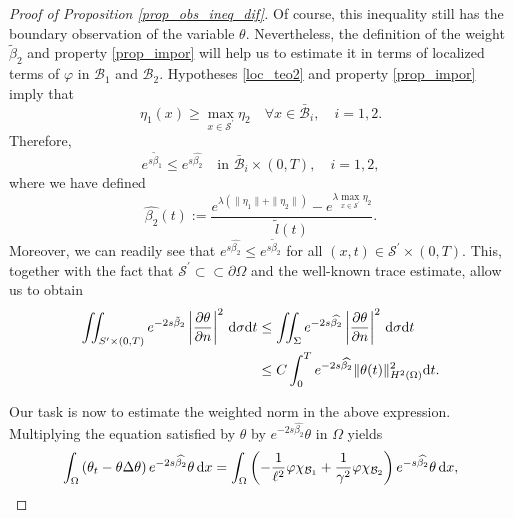 \documentclass[preprint,10pt]{article}
\numberwithin{equation}{section}
\numberwithin{theorem}{section}
\def\dx{\,\textnormal{d}x}
\def\dt{\textnormal{d}t}
\def\d{\,\textnormal{d}}
\newcommand\csin[1]{\chi_{#1}}
\def\dx{\,\textnormal{d}x}
\def\dt{\textnormal{d}t}
\def\d{\,\textnormal{d}}
\begin{document}
{\begin{proof}[Proof of Proposition \ref{prop_obs_ineq_dif}]
 Of course, this inequality still has the boundary observation of the variable $\theta$. Nevertheless, the definition of the weight $\tilde\beta_2$ and property \eqref{prop_impor} will help us to estimate it in terms of localized terms of $\varphi$ in $\mathcal B_1$ and $\mathcal B_2$. Hypotheses \eqref{loc_teo2} and property \eqref{prop_impor} imply that
 \begin{equation*}
 \eta_1(x) \geq \max_{x\in \mathcal S^\prime}\eta_2 \quad \forall  x\in\bar{\mathcal B}_i, \quad i=1,2.
 \end{equation*}
 Therefore,
 \begin{equation}\label{rel_eta1_eta2}
 e^{s\tilde\beta_1}\leq e^{s\widehat{\beta_2}} \quad\text{in } \bar{\mathcal B}_i\times(0,T), \quad i=1,2,
 \end{equation}
 where we have defined
 \begin{equation*}
 \widehat{\beta_2}(t):=\frac{e^{\lambda(\|\eta_1\|+\|\eta_2\|)}-e^{{\lambda}\max_{x\in\mathcal S^\prime}\eta_2}}{\widetilde{l}(t)}.
 \end{equation*}
Moreover, we can readily see that $e^{s\widehat{\beta_2}}\leq e^{s\tilde\beta_2}$ for all $(x,t)\in \mathcal S^\prime\times(0,T)$. This, together with the fact that $\mathcal S^\prime\subset\subset\partial \Omega$ and the well-known trace estimate, allow us to obtain 
%
\begin{align}\notag 
\iint_{S^{\prime}\times(0,T)}e^{-2s\tilde\beta_2}\left|\frac{\partial \theta}{\partial n}\right|^2\d\sigma\dt &\leq \iint_{\Sigma}e^{-2s\widehat{\beta_2}}\left|\frac{\partial \theta}{\partial n}\right|^2\d\sigma\dt \\ \label{est_local_theta}
&\leq C\int_{0}^{T}e^{-2s\widehat{\beta_2}}\|\theta(t)\|_{H^2(\Omega)}^2\dt.
\end{align}

Our task is now to estimate the weighted norm in the above expression. Multiplying the equation satisfied by $\theta$ by $e^{-2s\widehat{\beta_2}}\theta$ in $\Omega$ yields
%
\begin{equation*}\int_{\Omega}\left(\theta_t-\theta \Delta \theta\right) e^{-2s\widehat{\beta_2}}\theta \dx=\int_{\Omega}\left(-\frac{1}{\ell^2}\varphi\csin{\mathcal B_1}+\frac{1}{\gamma^2}\varphi \csin{\mathcal B_2}\right)e^{-s\widehat{\beta_2}}\theta\dx,\end{equation*}


\end{proof}}
\end{document}

